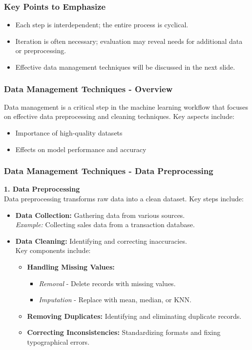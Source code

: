 \documentclass{beamer}
\begin{document}
\begin{frame}
    \frametitle{Key Points to Emphasize}
    \begin{itemize}
        \item Each step is interdependent; the entire process is cyclical.
        \item Iteration is often necessary; evaluation may reveal needs for additional data or preprocessing.
        \item Effective data management techniques will be discussed in the next slide.
    \end{itemize}
\end{frame}

\begin{frame}[fragile]
    \frametitle{Data Management Techniques - Overview}
    Data management is a critical step in the machine learning workflow that focuses on effective data preprocessing and cleaning techniques. Key aspects include:
    \begin{itemize}
        \item Importance of high-quality datasets
        \item Effects on model performance and accuracy
    \end{itemize}
\end{frame}

\begin{frame}[fragile]
    \frametitle{Data Management Techniques - Data Preprocessing}

    \textbf{1. Data Preprocessing}\\
    Data preprocessing transforms raw data into a clean dataset. Key steps include:
    \begin{itemize}
        \item \textbf{Data Collection:} Gathering data from various sources.\\
        \textit{Example:} Collecting sales data from a transaction database.
        
        \item \textbf{Data Cleaning:} Identifying and correcting inaccuracies.\\
        Key components include:
        \begin{itemize}
            \item \textbf{Handling Missing Values:}
            \begin{itemize}
                \item \textit{Removal} - Delete records with missing values.
                \item \textit{Imputation} - Replace with mean, median, or KNN.
            \end{itemize}

            \item \textbf{Removing Duplicates:} Identifying and eliminating duplicate records.
            
            \item \textbf{Correcting Inconsistencies:} Standardizing formats and fixing typographical errors.
        \end{itemize}
    \end{itemize}
\end{frame}
\end{document}
